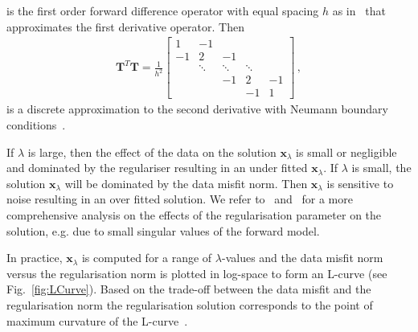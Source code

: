 is the first order forward difference operator with equal spacing $h$ as in~\cite{tan2016LecNot} that approximates the first derivative operator.
Then 
\begin{align}
	\bm{T}^T\bm{T} = \frac{1}{h^2}
	\begin{bmatrix}
		1 & -1 & & &  \\
		-1 & 2& -1 & &   \\
		& \ddots & \ddots & \ddots &\\ 
		& & -1 & 2 & -1  \\
		& & & -1 & 1 
	\end{bmatrix} \, ,
\end{align}
is a discrete approximation to the second derivative with Neumann boundary conditions~\cite{wang2015graphs}.

If $\lambda$ is large, then the effect of the data on the solution $\bm{x}_{\lambda}$ is small or negligible and dominated by the regulariser resulting in an under fitted $\bm{x}_{\lambda}$.
If $\lambda$ is small, the solution $\bm{x}_{\lambda}$ will be dominated by the data misfit norm.
Then $\bm{x}_{\lambda}$ is sensitive to noise resulting in an over fitted solution.
We refer to~\cite{hansen1989GSVD} and~\cite{tan2016LecNot} for a more comprehensive analysis on the effects of the regularisation parameter on the solution, e.g. due to small singular values of the forward model.


In practice, $\bm{x}_{\lambda}$ is computed for a range of $\lambda$-values and the data misfit norm versus the regularisation norm is plotted in log-space to form an L-curve (see Fig.~\ref{fig:LCurve}).
Based on the trade-off between the data misfit and the regularisation norm the regularisation solution corresponds to the point of maximum curvature of the L-curve~\cite{hansen1993use}.

